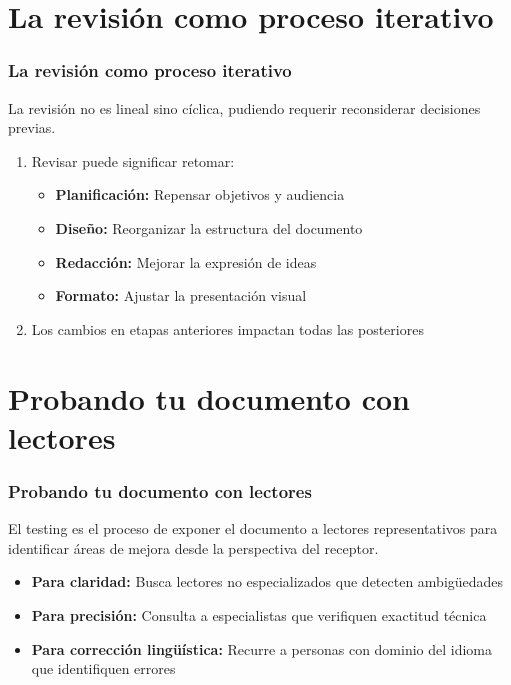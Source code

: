 \documentclass{beamer}
\begin{document}
\section{La revisión como proceso iterativo}
\begin{frame}
\frametitle{La revisión como proceso iterativo}

\textbf{} La revisión no es lineal sino cíclica, pudiendo requerir reconsiderar decisiones previas.

\vspace{0.3cm}
\begin{enumerate}
\item Revisar puede significar retomar:
   \begin{itemize}
   \item \textbf{Planificación:} Repensar objetivos y audiencia
   \item \textbf{Diseño:} Reorganizar la estructura del documento
   \item \textbf{Redacción:} Mejorar la expresión de ideas
   \item \textbf{Formato:} Ajustar la presentación visual
   \end{itemize}
\vspace{0.3cm}
\item Los cambios en etapas anteriores impactan todas las posteriores
\end{enumerate}
\end{frame}


\section{Probando tu documento con lectores}
\begin{frame}
\frametitle{Probando tu documento con lectores}

\textbf{} El testing es el proceso de exponer el documento a lectores representativos para identificar áreas de mejora desde la perspectiva del receptor.

\vspace{0.5cm}
\begin{itemize}
\item \textbf{Para claridad:} Busca lectores no especializados que detecten ambigüedades
\item \textbf{Para precisión:} Consulta a especialistas que verifiquen exactitud técnica
\item \textbf{Para corrección lingüística:} Recurre a personas con dominio del idioma que identifiquen errores
\end{itemize}
\end{frame}
\end{document}
